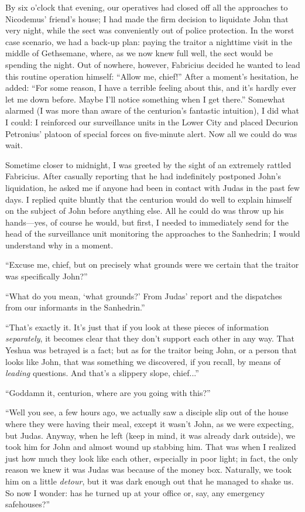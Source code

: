 By six o'clock that evening, our operatives had closed off all the approaches to Nicodemus' friend's house; I had made the firm decision to liquidate John that very night, while the sect was conveniently out of police protection. In the worst case scenario, we had a back-up plan: paying the traitor a nighttime visit in the middle of Gethsemane, where, as we now knew full well, the sect would be spending the night. Out of nowhere, however, Fabricius decided he wanted to lead this routine operation himself: ``Allow me, chief!'' After a moment's hesitation, he added: ``For some reason, I have a terrible feeling about this, and it's hardly ever let me down before. Maybe I'll notice something when I get there.'' Somewhat alarmed (I was more than aware of the centurion's fantastic intuition), I did what I could: I reinforced our surveillance units in the Lower City and placed Decurion Petronius' platoon of special forces on five-minute alert. Now all we could do was wait.

Sometime closer to midnight, I was greeted by the sight of an extremely rattled Fabricius. After casually reporting that he had indefinitely postponed John's liquidation, he asked me if anyone had been in contact with Judas in the past few days. I replied quite bluntly that the centurion would do well to explain himself on the subject of John before anything else. All he could do was throw up his hands---yes, of course he would, but first, I needed to immediately send for the head of the surveillance unit monitoring the approaches to the Sanhedrin; I would understand why in a moment.

``Excuse me, chief, but on precisely what grounds were we certain that the traitor was specifically John?''

``What do you mean, `what grounds?' From Judas' report and the dispatches from our informants in the Sanhedrin.''

``That's exactly it. It's just that if you look at these pieces of information \emph{separately}, it becomes clear that they don't support each other in any way. That Yeshua was betrayed is a fact; but as for the traitor being John, or a person that looks like John, that was something we discovered, if you recall, by means of \emph{leading} questions. And that's a slippery slope, chief...''

``Goddamn it, centurion, where are you going with this?''

``Well you see, a few hours ago, we actually saw a disciple slip out of the house where they were having their meal, except it wasn't John, as we were expecting, but Judas. Anyway, when he left (keep in mind, it was already dark outside), we took him for John and almost wound up stabbing him. That was when I realized just how much they look like each other, especially in poor light; in fact, the only reason we knew it was Judas was because of the money box. Naturally, we took him on a little \emph{detour}, but it was dark enough out that he managed to shake us. So now I wonder: has he turned up at your office or, say, any emergency safehouses?''

